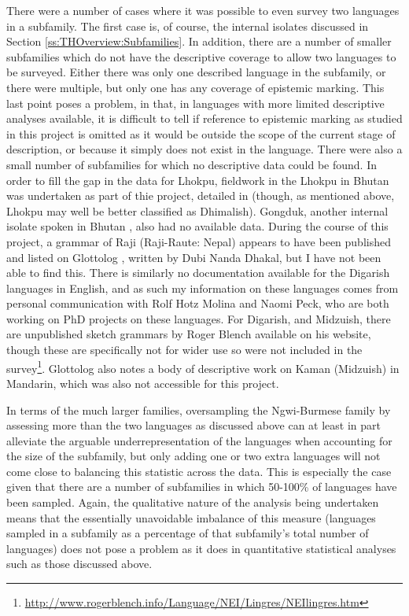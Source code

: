 There were a number of cases where it was possible to even survey two languages in a subfamily. The first case is, of course, the internal isolates discussed in Section \ref{ss:THOverview:Subfamilies}. In addition, there are a number of smaller subfamilies which do not have the descriptive coverage to allow two languages to be surveyed. Either there was only one described language in the subfamily, or there were multiple, but only one has any coverage of epistemic marking. This last point poses a problem, in that, in languages with more limited descriptive analyses available, it is difficult to tell if reference to epistemic marking as studied in this project is omitted as it would be outside the scope of the current stage of description, or because it simply does not exist in the language. There were also a small number of subfamilies for which no descriptive data could be found. In order to fill the gap in the data for Lhokpu, fieldwork in the Lhokpu in Bhutan was undertaken as part of thie project, detailed in  (though, as mentioned above, Lhokpu may well be better classified as Dhimalish). Gongduk, another internal isolate spoken in Bhutan \cite{VanDriem2001b}, also had no available data. During the course of this project, a grammar of Raji (Raji-Raute: Nepal) appears to have been published and listed on Glottolog \cite{glottolog}, written by Dubi Nanda Dhakal, but I have not been able to find this. There is similarly no documentation available for the Digarish languages in English, and as such my information on these languages comes from personal communication with Rolf Hotz Molina and Naomi Peck, who are both working on PhD projects on these languages. For Digarish, and Midzuish, there are unpublished sketch grammars by Roger Blench available on his website, though these are specifically not for wider use so were not included in the survey\footnote{\url{http://www.rogerblench.info/Language/NEI/Lingres/NEIlingres.htm}}. Glottolog also notes a body of descriptive work on Kaman (Midzuish) in Mandarin, which was also not accessible for this project.

In terms of the much larger families, oversampling the Ngwi-Burmese family by assessing more than the two languages as discussed above can at least in part alleviate the arguable underrepresentation of the languages when accounting for the size of the subfamily, but only adding one or two extra languages will not come close to balancing this statistic across the data. This is especially the case given that there are a number of subfamilies in which 50-100\% of languages have been sampled. Again, the qualitative nature of the analysis being undertaken means that the essentially unavoidable imbalance of this measure (languages sampled in a subfamily as a percentage of that subfamily's total number of languages) does not pose a problem as it does in quantitative statistical analyses such as those discussed above.

